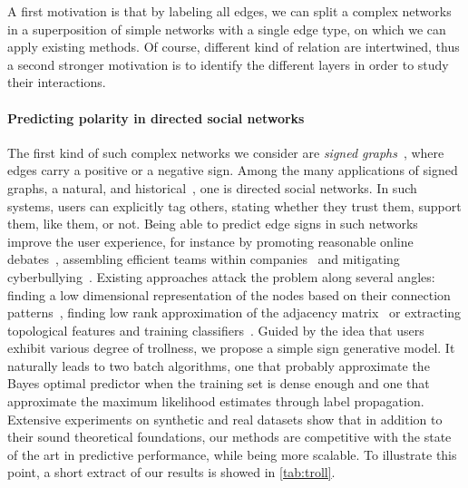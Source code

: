 A first motivation is that by labeling all edges, we can split a complex networks in a superposition
of simple networks with a single edge type, on which we can apply existing methods. Of course,
different kind of relation are intertwined, thus a second stronger motivation is to identify the
different layers in order to study their interactions.

\vspace{-\baselineskip}
\paragraph{Predicting polarity in directed social networks}

The first kind of such complex networks we consider are \emph{signed graphs}~\autocite{Tang2015a},
where edges carry a positive or a negative sign. Among the many applications of signed graphs, a
natural, and historical~\autocite{harary1953}, one is directed social networks. In such systems,
users can explicitly tag others, stating whether they trust them, support them, like them, or not.
Being able to predict edge signs in such networks improve the user experience, for instance by
promoting reasonable online debates~\autocite{journalism15}, assembling efficient teams within
companies~\autocite{MLinHR16} and mitigating cyberbullying~\autocite{cyberbullying13}. Existing
approaches attack the problem along several angles: finding a low dimensional representation of the
nodes based on their connection patterns~\autocites{SIGNet17}{SNE17}, finding low rank approximation
of the adjacency matrix~\autocites{LowRankCompletion14}{OnlineCompletion17} or extracting
topological features and training classifiers~\autocites{Leskovec2010}{Bayesian15}{wu2016troll}.
Guided by the idea that users exhibit various degree of trollness, we propose a simple sign
generative model. It naturally leads to two batch algorithms, one that probably approximate the
Bayes optimal predictor when the training set is dense enough and one that approximate the maximum
likelihood estimates through label propagation. Extensive experiments on synthetic and real datasets
show that in addition to their sound theoretical foundations, our methods are competitive with the
state of the art in predictive performance, while being more scalable. To illustrate this point, a
short extract of our results is showed in \autoref{tab:troll}.

